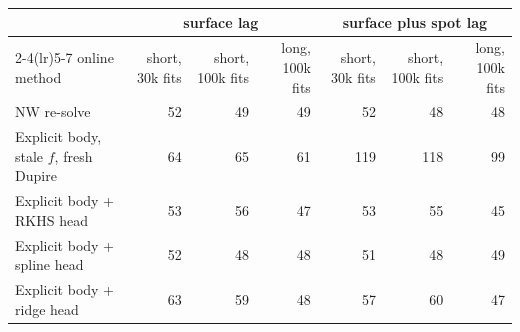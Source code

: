 \begin{tabular}{l rrr rrr}
\toprule
 & \multicolumn{3}{c}{surface lag} & \multicolumn{3}{c}{surface plus spot lag}\\
\cmidrule(lr){2-4}\cmidrule(lr){5-7}
online method & short, 30k fits & short, 100k fits & long, 100k fits & short, 30k fits & short, 100k fits & long, 100k fits\\
\midrule
NW re-solve & 52 & 49 & 49 & 52 & 48 & 48\\
Explicit body, stale $f$, fresh Dupire & 64 & 65 & 61 & 119 & 118 & 99\\
Explicit body + RKHS head & 53 & 56 & 47 & 53 & 55 & 45\\
Explicit body + spline head & 52 & 48 & 48 & 51 & 48 & 49\\
Explicit body + ridge head & 63 & 59 & 48 & 57 & 60 & 47\\
\bottomrule
\end{tabular}
